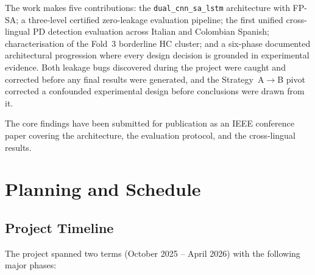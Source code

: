 \documentclass[oneside,openany]{final_report}
\newcommand{\dualcnn}{\texttt{dual\_cnn\_sa\_lstm}}
\begin{document}
The work makes five contributions: the \dualcnn{} architecture with FP-SA; a three-level certified zero-leakage evaluation pipeline; the first unified cross-lingual PD detection evaluation across Italian and Colombian Spanish; characterisation of the Fold~3 borderline HC cluster; and a six-phase documented architectural progression where every design decision is grounded in experimental evidence. Both leakage bugs discovered during the project were caught and corrected before any final results were generated, and the Strategy~A$\to$B pivot corrected a confounded experimental design before conclusions were drawn from it.

The core findings have been submitted for publication as an IEEE conference paper covering the architecture, the evaluation protocol, and the cross-lingual results.

\chapter{Planning and Schedule}

\section{Project Timeline}

The project spanned two terms (October 2025 -- April 2026) with the following major phases:
\end{document}
